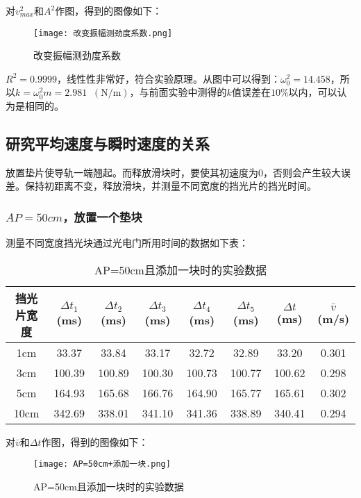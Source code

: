 \documentclass[11pt]{article}
\newcommand*{\unit}[1]{\mathop{}\!\mathrm{#1}}
\begin{document}
对$v_{max}^2$和$A^2$作图，得到的图像如下：

\begin{figure}[H]
    \centering
    \texttt{[image: 改变振幅测劲度系数.png]}
    \caption{改变振幅测劲度系数}
\end{figure}

$R^2 = 0.9999$，线性性非常好，符合实验原理。从图中可以得到：$\omega_0^2=14.458$，所以$k=\omega_0^2 m = 2.981 \unit{(N/m)}$，与前面实验中测得的$k$值误差在$10\%$以内，可以认为是相同的。

\subsection{研究平均速度与瞬时速度的关系}

放置垫片使导轨一端翘起。而释放滑块时，要使其初速度为0，否则会产生较大误差。保持初距离不变，释放滑块，并测量不同宽度的挡光片的挡光时间。

\subsubsection{$AP = 50cm$，放置一个垫块}

测量不同宽度挡光块通过光电门所用时间的数据如下表：

\begin{table}[H]
    \centering
    \caption{AP=50cm且添加一块时的实验数据}
    \begin{tabular}{|c|c|c|c|c|c|c|c|}
        \hline
        挡光片宽度&$\Delta t_1$(ms)&$\Delta t_2$(ms)&$\Delta t_3$(ms)&$\Delta t_4$(ms)&$\Delta t_5$(ms)&$\Delta t$(ms)&$\bar{v}$(m/s)\\
        \hline
        1cm&33.37  & 33.84  & 33.17  & 32.72  & 32.89  & 33.20  & 0.301  \\
        \hline
        3cm&100.39  & 100.89  & 100.30  & 100.73  & 100.77  & 100.62  & 0.298  \\
        \hline
        5cm&164.93  & 165.68  & 166.76  & 164.90  & 165.77  & 165.61  & 0.302  \\
        \hline
        10cm&342.69  & 338.01  & 341.10  & 341.36  & 338.89  & 340.41  & 0.294  \\
        \hline
    \end{tabular}
\end{table}

对$\bar{v}$和$\Delta t$作图，得到的图像如下：

\begin{figure}[H]
    \centering
    \texttt{[image: AP=50cm+添加一块.png]}
    \caption{AP=50cm且添加一块时的实验数据}
\end{figure}
\end{document}
